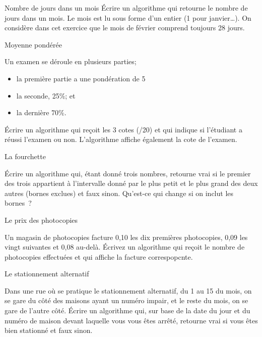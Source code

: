 		\begin{Exercice}{Nombre de jours dans un mois}
			Écrire un algorithme qui retourne le nombre de jours dans un mois. 
			Le mois est lu sous forme d’un entier (1 pour janvier\dots).
			On considère dans cet exercice que le mois de février
			comprend toujours 28 jours.
		\end{Exercice}

		\begin{Exercice}{Moyenne pondérée}

			Un examen se déroule en plusieurs parties;
			\begin{itemize}
				\item la première partie a une pondération de 5%
				\item la seconde, 25\%; et
				\item la dernière 70\%.
			\end{itemize}
			Écrire un algorithme qui reçoit les 3 cotes (/20) et qui indique
			si l'étudiant a réussi l'examen ou non. L'algorithme affiche également
			la cote de l'examen. 
		\end{Exercice}	


		\begin{Exercice}{La fourchette}

			Écrire un algorithme qui, étant donné trois nombres, 
			retourne vrai si le premier des trois 
			appartient à l’intervalle donné par le plus petit et le plus grand 
			des deux autres (bornes exclues) et faux sinon. 
			Qu’est-ce qui change si on inclut les bornes~?
		\end{Exercice}

		\begin{Exercice}{Le prix des photocopies}

			Un magasin de photocopies facture 0,10 \texteuro{} 
			les dix premières photocopies, 
			0,09 \texteuro{} les vingt suivantes 
			et 0,08 \texteuro{} au-delà. 
			Écrivez un algorithme 
			qui reçoit le nombre de photocopies effectuées 
			et qui affiche la facture correspopcnte.
		\end{Exercice}

		\begin{Exercice}{Le stationnement alternatif}

			Dans une rue où se pratique le stationnement alternatif, du 1 au 15
			du mois, on se gare du côté des maisons ayant un numéro impair, et
			le reste du mois, on se gare de l’autre côté.  Écrire un algorithme
			qui, sur base de la date du jour et du numéro de maison devant
			laquelle vous vous êtes arrêté, retourne vrai si vous êtes bien
			stationné et faux sinon.  \end{Exercice}




